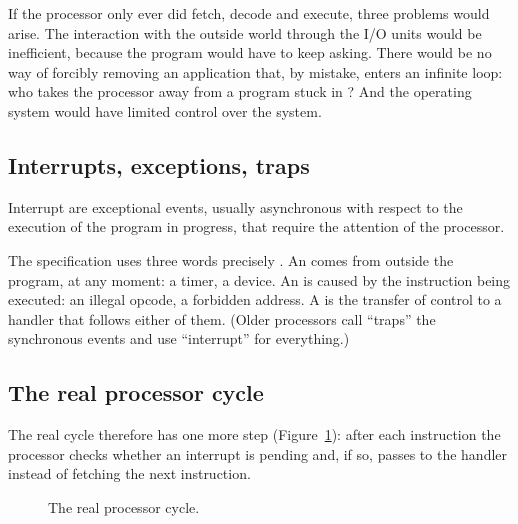 If the processor only ever did fetch, decode and execute, three problems would
arise. The interaction with the outside world through the I/O units would be
inefficient, because the program would have to keep asking. There would be no
way of forcibly removing an application that, by mistake, enters an infinite
loop: who takes the processor away from a program stuck in ? And
the operating system would have limited control over the system.

\subsection{Interrupts, exceptions, traps}

\begin{definition}{Interrupt}
 are exceptional events, usually asynchronous with respect to
the execution of the program in progress, that require the attention of the
processor.
\end{definition}

The \riscv specification uses three words precisely \citep{riscvpriv}. An
 comes from outside the program, at any moment: a timer, a
device. An  is caused by the instruction being executed: an
illegal opcode, a forbidden address. A  is the transfer of control
to a handler that follows either of them. (Older processors call ``traps''
the synchronous events and use ``interrupt'' for everything.)

\subsection{The real processor cycle}

The real cycle therefore has one more step (Figure~\ref{fig:ins:real}): after
each instruction the processor checks whether an interrupt is pending and, if
so, passes to the handler instead of fetching the next instruction.

\begin{figure}[htb]
\centering
{}
\caption{The real processor cycle.}
\label{fig:ins:real}
\end{figure}

